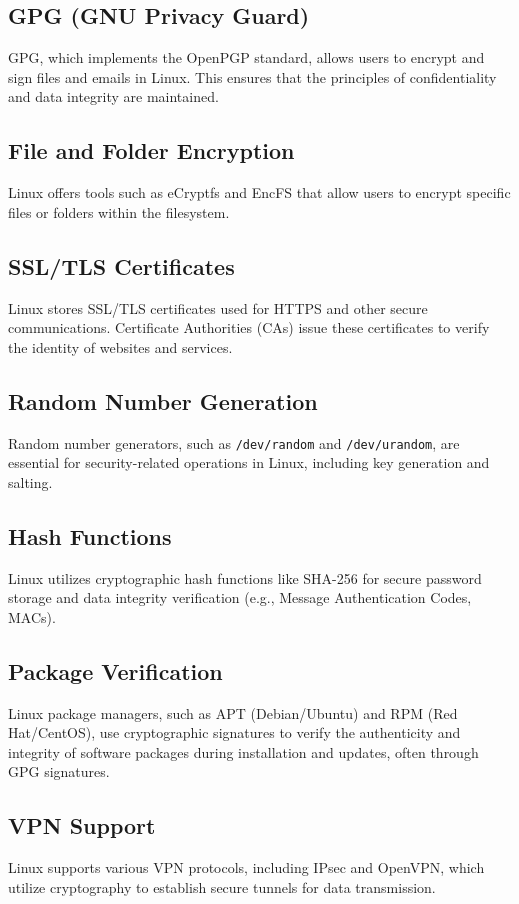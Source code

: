 \documentclass[conference]{IEEEtran}
\begin{document}
\subsection{GPG (GNU Privacy Guard)}
GPG, which implements the OpenPGP standard, allows users to encrypt and sign files and emails in Linux. This ensures that the principles of confidentiality and data integrity are maintained.

\subsection{File and Folder Encryption}
Linux offers tools such as eCryptfs and EncFS that allow users to encrypt specific files or folders within the filesystem.

\subsection{SSL/TLS Certificates}
Linux stores SSL/TLS certificates used for HTTPS and other secure communications. Certificate Authorities (CAs) issue these certificates to verify the identity of websites and services.

\subsection{Random Number Generation}
Random number generators, such as \texttt{/dev/random} and \texttt{/dev/urandom}, are essential for security-related operations in Linux, including key generation and salting.

\subsection{Hash Functions}
Linux utilizes cryptographic hash functions like SHA-256 for secure password storage and data integrity verification (e.g., Message Authentication Codes, MACs).

\subsection{Package Verification}
Linux package managers, such as APT (Debian/Ubuntu) and RPM (Red Hat/CentOS), use cryptographic signatures to verify the authenticity and integrity of software packages during installation and updates, often through GPG signatures.

\subsection{VPN Support}
Linux supports various VPN protocols, including IPsec and OpenVPN, which utilize cryptography to establish secure tunnels for data transmission.
\end{document}
